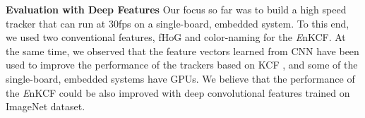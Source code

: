 \documentclass[10pt,twocolumn,letterpaper]{article}
\begin{document}
\textbf{Evaluation with Deep Features} Our focus so far was to build a
high speed tracker that can run at $30$fps on a single-board, embedded
system. To this end, we used two conventional features, fHoG and
color-naming for the {\it E}nKCF. At the same time, we observed that
the feature vectors learned from CNN have been used to improve the
performance of the trackers based on KCF \cite{ma2015hierarchical,
  danelljan2015convolutional}, and some of the single-board, embedded
systems have GPUs. We believe that the performance of the {\it E}nKCF
could be also improved with deep convolutional features trained on ImageNet dataset.

\end{document}
